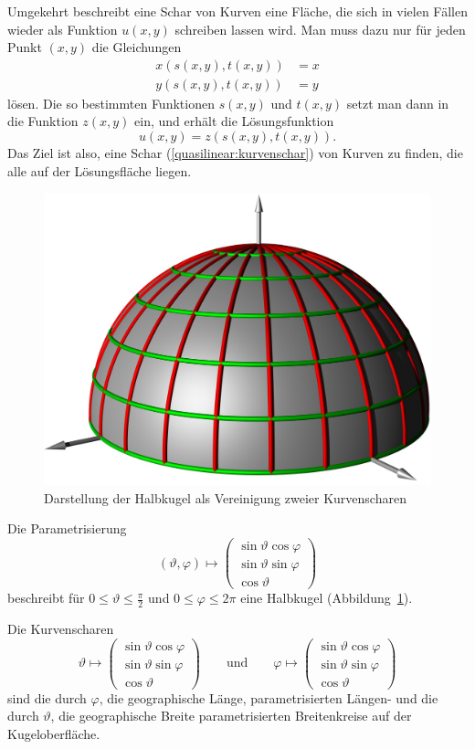 Umgekehrt beschreibt eine Schar von Kurven eine Fläche, die sich
in vielen Fällen wieder als Funktion $u(x,y)$ schreiben lassen wird.
Man muss dazu nur für jeden Punkt $(x,y)$ die Gleichungen
\begin{align*}
x(s(x,y),t(x,y))&=x\\
y(s(x,y),t(x,y))&=y
\end{align*}
lösen.
Die so bestimmten Funktionen $s(x,y)$ und $t(x,y)$ setzt man dann in
die Funktion $z(x,y)$ ein, und erhält die
Lösungsfunktion
\[
u(x,y)=z(s(x,y), t(x,y)).
\]
Das Ziel ist also, eine Schar (\ref{quasilinear:kurvenschar})
von Kurven zu finden, die alle auf der Lösungsfläche liegen.

\begin{beispiel}
\begin{figure}
\centering
\includegraphics[width=0.8\hsize]{3d/kugel.jpg}
\caption{Darstellung der Halbkugel als Vereinigung zweier Kurvenscharen
\label{quasilinear:kugel}}
\end{figure}
Die Parametrisierung
\[
(\vartheta,\varphi)\mapsto
\begin{pmatrix}
\sin\vartheta\cos\varphi\\
\sin\vartheta\sin\varphi\\
\cos\vartheta
\end{pmatrix}
\]
beschreibt für $0\le \vartheta\le \frac{\pi}2$
und $0\le\varphi\le 2\pi$ eine Halbkugel (Abbildung~\ref{quasilinear:kugel}).

Die Kurvenscharen
\[
\vartheta\mapsto
\begin{pmatrix}
\sin\vartheta\cos\varphi\\
\sin\vartheta\sin\varphi\\
\cos\vartheta
\end{pmatrix}
\qquad
\text{und}
\qquad
\varphi\mapsto
\begin{pmatrix}
\sin\vartheta\cos\varphi\\
\sin\vartheta\sin\varphi\\
\cos\vartheta
\end{pmatrix}
\]
sind die durch $\varphi$, die geographische Länge, parametrisierten
Längen- und die durch $\vartheta$, die geographische Breite
parametrisierten Breitenkreise auf der Kugeloberfläche.


\end{beispiel}
